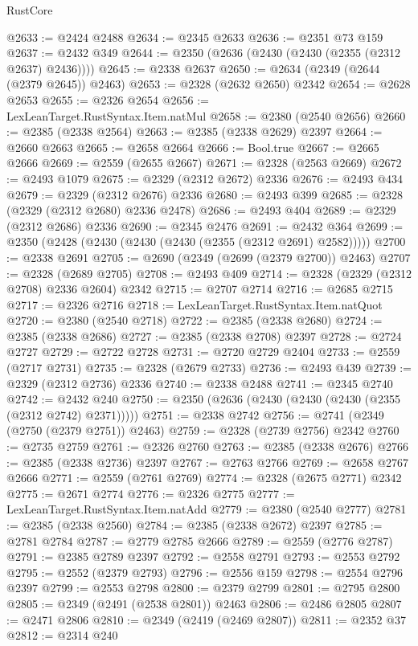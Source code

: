 \begin{lexlean}{RustCore}
\begin{coremodule}
@2633 := @2424 @2488
@2634 := @2345 @2633
@2636 := @2351 @73 @159
@2637 := @2432 @349
@2644 := @2350 (@2636 (@2430 (@2430 (@2355 (@2312 @2637) @2436))))
@2645 := @2338 @2637
@2650 := @2634 (@2349 (@2644 (@2379 @2645)) @2463)
@2653 := @2328 (@2632 @2650) @2342
@2654 := @2628 @2653
@2655 := @2326 @2654
@2656 := LexLeanTarget.RustSyntax.Item.natMul
@2658 := @2380 (@2540 @2656)
@2660 := @2385 (@2338 @2564)
@2663 := @2385 (@2338 @2629) @2397
@2664 := @2660 @2663
@2665 := @2658 @2664
@2666 := Bool.true
@2667 := @2665 @2666
@2669 := @2559 (@2655 @2667)
@2671 := @2328 (@2563 @2669)
@2672 := @2493 @1079
@2675 := @2329 (@2312 @2672) @2336
@2676 := @2493 @434
@2679 := @2329 (@2312 @2676) @2336
@2680 := @2493 @399
@2685 := @2328 (@2329 (@2312 @2680) @2336 @2478)
@2686 := @2493 @404
@2689 := @2329 (@2312 @2686) @2336
@2690 := @2345 @2476
@2691 := @2432 @364
@2699 := @2350 (@2428 (@2430 (@2430 (@2430 (@2355 (@2312 @2691) @2582)))))
@2700 := @2338 @2691
@2705 := @2690 (@2349 (@2699 (@2379 @2700)) @2463)
@2707 := @2328 (@2689 @2705)
@2708 := @2493 @409
@2714 := @2328 (@2329 (@2312 @2708) @2336 @2604) @2342
@2715 := @2707 @2714
@2716 := @2685 @2715
@2717 := @2326 @2716
@2718 := LexLeanTarget.RustSyntax.Item.natQuot
@2720 := @2380 (@2540 @2718)
@2722 := @2385 (@2338 @2680)
@2724 := @2385 (@2338 @2686)
@2727 := @2385 (@2338 @2708) @2397
@2728 := @2724 @2727
@2729 := @2722 @2728
@2731 := @2720 @2729 @2404
@2733 := @2559 (@2717 @2731)
@2735 := @2328 (@2679 @2733)
@2736 := @2493 @439
@2739 := @2329 (@2312 @2736) @2336
@2740 := @2338 @2488
@2741 := @2345 @2740
@2742 := @2432 @240
@2750 := @2350 (@2636 (@2430 (@2430 (@2430 (@2355 (@2312 @2742) @2371)))))
@2751 := @2338 @2742
@2756 := @2741 (@2349 (@2750 (@2379 @2751)) @2463)
@2759 := @2328 (@2739 @2756) @2342
@2760 := @2735 @2759
@2761 := @2326 @2760
@2763 := @2385 (@2338 @2676)
@2766 := @2385 (@2338 @2736) @2397
@2767 := @2763 @2766
@2769 := @2658 @2767 @2666
@2771 := @2559 (@2761 @2769)
@2774 := @2328 (@2675 @2771) @2342
@2775 := @2671 @2774
@2776 := @2326 @2775
@2777 := LexLeanTarget.RustSyntax.Item.natAdd
@2779 := @2380 (@2540 @2777)
@2781 := @2385 (@2338 @2560)
@2784 := @2385 (@2338 @2672) @2397
@2785 := @2781 @2784
@2787 := @2779 @2785 @2666
@2789 := @2559 (@2776 @2787)
@2791 := @2385 @2789 @2397
@2792 := @2558 @2791
@2793 := @2553 @2792
@2795 := @2552 (@2379 @2793)
@2796 := @2556 @159
@2798 := @2554 @2796 @2397
@2799 := @2553 @2798
@2800 := @2379 @2799
@2801 := @2795 @2800
@2805 := @2349 (@2491 (@2538 @2801)) @2463
@2806 := @2486 @2805
@2807 := @2471 @2806
@2810 := @2349 (@2419 (@2469 @2807))
@2811 := @2352 @37
@2812 := @2314 @240

\end{coremodule}
\end{lexlean}
